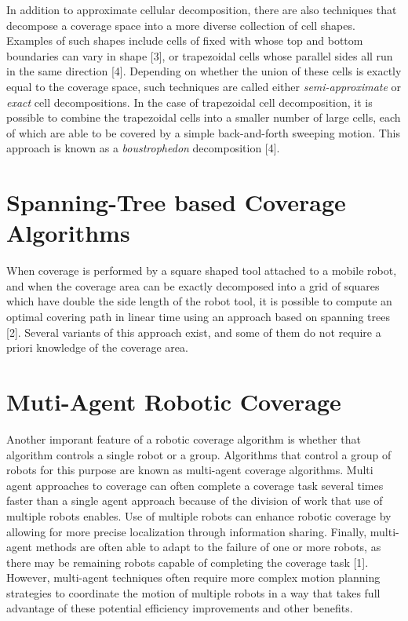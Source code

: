 \documentclass[letterpaper, 12pt, leqno]{report}
\begin{document}
In addition to approximate cellular decomposition, there are also techniques that decompose a coverage space into a more diverse collection of cell shapes. Examples of such shapes include cells of fixed with whose top and bottom boundaries can vary in shape [3], or trapezoidal cells whose parallel sides all run in the same direction [4]. Depending on whether the union of these cells is exactly equal to the coverage space, such techniques are called either \textit{semi-approximate} or \textit{exact} cell decompositions. In the case of trapezoidal cell decomposition, it is possible to combine the trapezoidal cells into a smaller number of large cells, each of which are able to be covered by a simple back-and-forth sweeping motion. This approach is known as a \textit{boustrophedon} decomposition [4].

\section{Spanning-Tree based Coverage Algorithms}

When coverage is performed by a square shaped tool attached to a mobile robot, and when the coverage area can be exactly decomposed into a grid of squares which have double the side length of the robot tool, it is possible to compute an optimal covering path in linear time using an approach based on spanning trees [2]. Several variants of this approach exist, and some of them do not require a priori knowledge of the coverage area. 

\section{Muti-Agent Robotic Coverage}

Another imporant feature of a robotic coverage algorithm is whether that algorithm controls a single robot or a group. Algorithms that control a group of robots for this purpose are known as multi-agent coverage algorithms. Multi agent approaches to coverage can often complete a coverage task several times faster than a single agent approach because of the division of work that use of multiple robots enables. Use of multiple robots can enhance robotic coverage by allowing for more precise localization through information sharing. Finally, multi-agent methods are often able to adapt to the failure of one or more robots, as there may be remaining robots capable of completing the coverage task [1]. However, multi-agent techniques often require more complex motion planning strategies to coordinate the motion of multiple robots in a way that takes full advantage of these potential efficiency improvements and other benefits.
\end{document}
